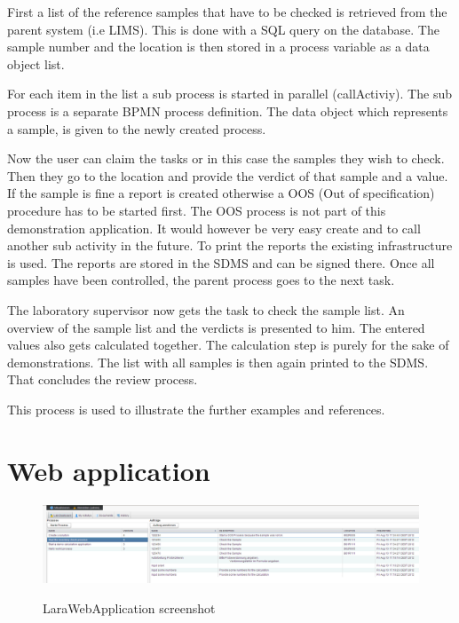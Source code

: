 \documentclass[paper=a4,twoside=false,BCOR=0mm,DIV=calc,fontsize=12pt]{scrartcl}
\begin{document}
First a list of the reference samples that have to be checked is retrieved from the parent system (i.e LIMS). This is done with a SQL query on the database. 
The sample number and the location is then stored in a process variable as a data object list.

For each item in the list a sub process is started in parallel (callActiviy). The sub process is a separate BPMN process definition.
The data object which represents a sample, is given to the newly created process.

Now the user can claim the tasks or in this case the samples they wish to check. Then they go to the location and provide the verdict of that sample and a value. If the sample is fine a report is created otherwise a OOS (Out of specification) procedure has to be started first. The OOS process is not part of this demonstration application. It would however be very easy create and to call another sub activity in the future.
To print the reports the existing infrastructure is used. The reports are stored in the SDMS and can be signed there.
Once all samples have been controlled, the parent process goes to the next task.

The laboratory supervisor now gets the task to check the sample list. An overview of the sample list and the verdicts is presented to him. The entered values also gets calculated together. The calculation step is purely for the sake of demonstrations.
The list with all samples is then again printed to the SDMS. That concludes the review process.

This process is used to illustrate the further examples and references.



\section{Web application}

\begin{figure}
    \begin{center}
      \includegraphics[width=1\textwidth]{./img/LaraWebApplicationScreenshot.png}\\
    \end{center}
  \caption{LaraWebApplication screenshot}
  \label{webapplicationscreenshot}
\end{figure} 
\end{document}
